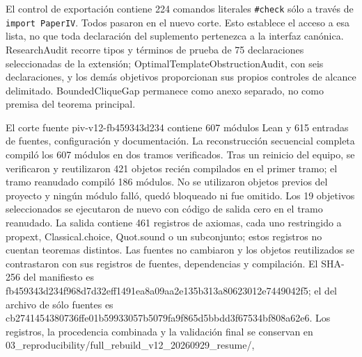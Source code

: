 \documentclass[spanish,11pt,a4paper]{article}
\begin{document}
El control de exportación contiene 224 comandos literales \nolinkurl{\#check} sólo a través de \mbox{\texttt{import\ PaperIV}}. Todos pasaron en el nuevo corte. Esto establece el acceso a esa lista, no que toda declaración del suplemento pertenezca a la interfaz canónica. {\ttfamily\small ResearchAudi\discretionary{\hbox{\ensuremath{\hookrightarrow}}}{}{}t} recorre tipos y términos de prueba de 75 declaraciones seleccionadas de la extensión; {\ttfamily\small OptimalTempl\discretionary{\hbox{\ensuremath{\hookrightarrow}}}{}{}ateObstructi\discretionary{\hbox{\ensuremath{\hookrightarrow}}}{}{}onAudit}, con seis declaraciones, y los demás objetivos proporcionan sus propios controles de alcance delimitado. BoundedCliqueGap permanece como anexo separado, no como premisa del teorema principal.

El corte fuente {\ttfamily\small piv-\discretionary{\hbox{\ensuremath{\hookrightarrow}}}{}{}v12-\discretionary{\hbox{\ensuremath{\hookrightarrow}}}{}{}fb459343d234} contiene 607 módulos Lean y 615 entradas de fuentes, configuración y documentación. La reconstrucción secuencial completa compiló los 607 módulos en dos tramos verificados. Tras un reinicio del equipo, se verificaron y reutilizaron 421 objetos recién compilados en el primer tramo; el tramo reanudado compiló 186 módulos. No se utilizaron objetos previos del proyecto y ningún módulo falló, quedó bloqueado ni fue omitido. Los 19 objetivos seleccionados se ejecutaron de nuevo con código de salida cero en el tramo reanudado. La salida contiene 461 registros de axiomas, cada uno restringido a {\ttfamily\small propext}, {\ttfamily\small Classical.\discretionary{\hbox{\ensuremath{\hookrightarrow}}}{}{}choice}, {\ttfamily\small Quot.\discretionary{\hbox{\ensuremath{\hookrightarrow}}}{}{}sound} o un subconjunto; estos registros no cuentan teoremas distintos. Las fuentes no cambiaron y los objetos reutilizados se contrastaron con sus registros de fuentes, dependencias y compilación. El SHA-256 del manifiesto es {\ttfamily\small fb459343d234\discretionary{\hbox{\ensuremath{\hookrightarrow}}}{}{}f968d7d32eff\discretionary{\hbox{\ensuremath{\hookrightarrow}}}{}{}1491ea8a09aa\discretionary{\hbox{\ensuremath{\hookrightarrow}}}{}{}2e135b313a80\discretionary{\hbox{\ensuremath{\hookrightarrow}}}{}{}623012e74490\discretionary{\hbox{\ensuremath{\hookrightarrow}}}{}{}42f5}; el del archivo de sólo fuentes es {\ttfamily\small cb2741454380\discretionary{\hbox{\ensuremath{\hookrightarrow}}}{}{}736ffe01b599\discretionary{\hbox{\ensuremath{\hookrightarrow}}}{}{}33057b5079fa\discretionary{\hbox{\ensuremath{\hookrightarrow}}}{}{}9f865d5bbdd3\discretionary{\hbox{\ensuremath{\hookrightarrow}}}{}{}f67534bf808a\discretionary{\hbox{\ensuremath{\hookrightarrow}}}{}{}62e6}. Los registros, la procedencia combinada y la validación final se conservan en {\ttfamily\small 03\_\discretionary{\hbox{\ensuremath{\hookrightarrow}}}{}{}reproducibil\discretionary{\hbox{\ensuremath{\hookrightarrow}}}{}{}ity/\discretionary{\hbox{\ensuremath{\hookrightarrow}}}{}{}full\_\discretionary{\hbox{\ensuremath{\hookrightarrow}}}{}{}rebuild\_\discretionary{\hbox{\ensuremath{\hookrightarrow}}}{}{}v12\_\discretionary{\hbox{\ensuremath{\hookrightarrow}}}{}{}20260929\_\discretionary{\hbox{\ensuremath{\hookrightarrow}}}{}{}resume/}, 
\end{document}
